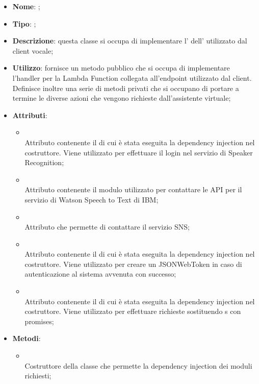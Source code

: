 \begin{itemize}
	\item \textbf{Nome}: ;
	\item \textbf{Tipo}: ;
	\item \textbf{Descrizione}: questa classe si occupa di implementare l' dell' utilizzato dal client vocale;
	\item \textbf{Utilizzo}: fornisce un metodo pubblico che si occupa di implementare l'handler per la Lambda Function collegata all'endpoint utilizzato dal client. Definisce inoltre una serie di metodi privati che si occupano di portare a termine le diverse azioni che vengono richieste dall'assistente virtuale;
	\item \textbf{Attributi}:
	\begin{itemize}
		\item[]  \\
		Attributo contenente il  di cui è stata eseguita la dependency injection nel costruttore. Viene utilizzato per effettuare il login nel servizio di Speaker Recognition;
		\item[]  \\
		Attributo contenente il modulo utilizzato per contattare le API per il servizio di Watson Speech to Text di IBM;
		\item[]  \\
		Attributo che permette di contattare il servizio SNS;
		\item[]  \\
		Attributo contenente il  di cui è stata eseguita la dependency injection nel costruttore. Viene utilizzato per creare un JSONWebToken in caso di autenticazione al sistema avvenuta con successo;
		\item[]  \\
		Attributo contenente il  di cui è stata eseguita la dependency injection nel costruttore. Viene utilizzato per effettuare richieste  sostituendo s con promises;
	\end{itemize}
	\item \textbf{Metodi}:
	\begin{itemize}
		\item[]  \\		Costruttore della classe  che permette la dependency injection dei moduli richiesti;\\

\end{itemize}
\end{itemize}
